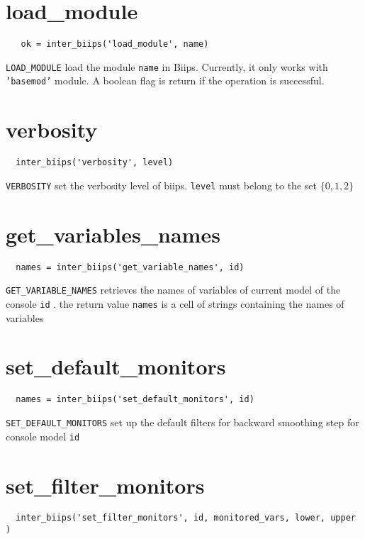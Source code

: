 \documentclass[11pt,twoside]{article}
\begin{document}
\section{load\_module}
 
 \begin{lstlisting}
   ok = inter_biips('load_module', name)
 \end{lstlisting}

  \texttt{LOAD\_MODULE} load the module \texttt{name} in Biips. Currently, it only works with \texttt{'basemod'} module. A 
  boolean flag is return if the operation is successful.

\section{verbosity}
 
 \begin{lstlisting}
  inter_biips('verbosity', level) 
 \end{lstlisting}

  \texttt{VERBOSITY} set the verbosity level of biips. \texttt{level} must belong to the set $\{0,1,2\}$

\section{get\_variables\_names}

 \begin{lstlisting}
  names = inter_biips('get_variable_names', id)
 \end{lstlisting}

 \texttt{GET\_VARIABLE\_NAMES} retrieves the names of variables of current model of the console \texttt{id} . the return value \texttt{names}
 is a cell of strings containing the names of variables

\section{set\_default\_monitors}

 \begin{lstlisting}
  names = inter_biips('set_default_monitors', id)
 \end{lstlisting}

 \texttt{SET\_DEFAULT\_MONITORS} set up the default filters for backward smoothing step for console model \texttt{id}

\section{set\_filter\_monitors}
 \begin{lstlisting}
  inter_biips('set_filter_monitors', id, monitored_vars, lower, upper )
 \end{lstlisting}
   
\end{document}
